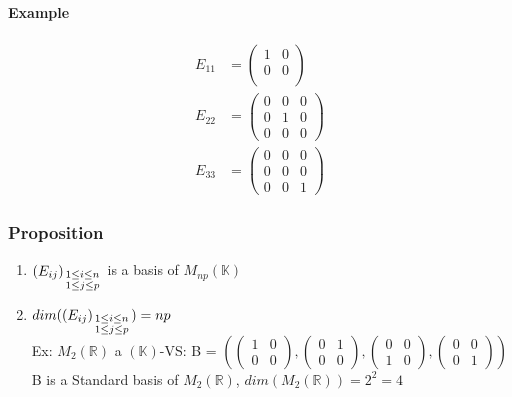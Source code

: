 \documentclass[notitlepage]{math}
\begin{document}
\paragraph{Example}
\begin{align*}
    E_{11} & = \begin{pmatrix}
        1 & 0 \\
        0 & 0 \\
    \end{pmatrix} \\
    E_{22} & = \begin{pmatrix}
        0 & 0 & 0 \\
        0 & 1 & 0 \\
        0 & 0 & 0
    \end{pmatrix} \\
    E_{33} & = \begin{pmatrix}
        0 & 0 & 0 \\
        0 & 0 & 0 \\
        0 & 0 & 1
    \end{pmatrix}
\end{align*}
\subsubsection{Proposition}
\begin{enumerate}
    \item $(E_{ij})_{\begin{smallmatrix} 1 \leq i \leq n \\ 1 \leq j \leq p \end{smallmatrix}}$ is a basis of $M_{np}(\mathbb{K})$
    \item $dim((E_{ij})_{\begin{smallmatrix} 1 \leq i \leq n \\ 1 \leq j \leq p \end{smallmatrix}}) = np$ \\
    Ex: $M_{2}(\mathbb{R})$ a $(\mathbb{K})$-VS: B = $\left( 
        \begin{pmatrix}
            1 & 0 \\
            0 & 0
        \end{pmatrix},
        \begin{pmatrix}
            0 & 1 \\
            0 & 0
        \end{pmatrix},
        \begin{pmatrix}
            0 & 0 \\
            1 & 0
        \end{pmatrix},
        \begin{pmatrix}
            0 & 0 \\
            0 & 1
        \end{pmatrix}
    \right)$\\
    B is a Standard basis of $M_{2}(\mathbb{R})$, $dim(M_2(\mathbb{R})) = 2^2 = 4$
\end{enumerate}
\end{document}
